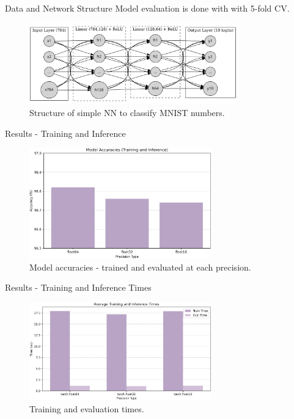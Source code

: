 \documentclass[aspectratio=169]{beamer} %
\begin{document}
\begin{frame}{Data and Network Structure}
  Model evaluation is done with with 5-fold CV.\\

  \begin{figure}
    \includegraphics[width=0.8\textwidth]{figures/mlp.png}
    \caption{Structure of simple NN to classify MNIST numbers.}
  \end{figure}
\end{frame}

\begin{frame}{Results - Training and Inference}
  \begin{figure}
    \includegraphics[width=0.7\textwidth]{figures/trainingAndInference.png}
    \caption{Model accuracies - trained and evaluated at each precision.}
  \end{figure}
\end{frame}

\begin{frame}{Results - Training and Inference Times}
  \begin{figure}
    \includegraphics[width=0.7\textwidth]{figures/times.png}
    \caption{Training and evaluation times.}
  \end{figure}
\end{frame}
\end{document}
